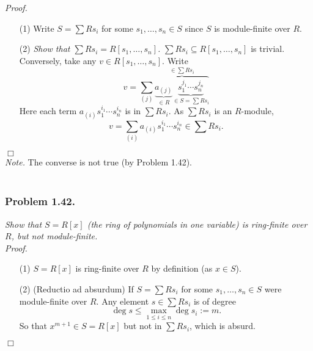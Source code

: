 \documentclass{article}
\begin{document}
\emph{Proof.}
\begin{enumerate}
\item[(1)]
  Write $S = \sum R s_i$ for some $s_1, \ldots, s_n \in S$
  since $S$ is module-finite over $R$.

\item[(2)]
  \emph{Show that $\sum R s_i = R[s_1,\ldots,s_n]$.}
  $\sum R s_i \subseteq R[s_1,\ldots,s_n]$ is trivial.
  Conversely, take any $v \in R[s_1,\ldots,s_n]$.
  Write
  \[
    v = \sum_{(j)} \overbrace{
      \underbrace{a_{(j)}}_{\in R}
      \underbrace{s_1^{j_1} \cdots s_n^{j_n}}_{\in S = \sum R s_i}}^{\in \sum R s_i}
  \]
  Here each term $a_{(i)} s_1^{i_1} \cdots s_n^{i_n}$ is in $\sum R s_i$.
  As $\sum R s_i$ is an $R$-module,
  \[
    v = \sum_{(i)} a_{(i)} s_1^{i_1} \cdots s_n^{i_n} \in \sum R s_i.
  \]
\end{enumerate}
$\Box$ \\



\emph{Note.}
  The converse is not true (by Problem 1.42). \\\\






\subsubsection*{Problem 1.42.}
\emph{Show that $S = R[x]$ (the ring of polynomials in one variable)
is ring-finite over $R$, but not module-finite.} \\

\emph{Proof.}
\begin{enumerate}
\item[(1)]
  $S = R[x]$ is ring-finite over $R$ by definition (as $x \in S$).

\item[(2)]
  (Reductio ad absurdum)
  If $S = \sum R s_i$ for some $s_1, \ldots, s_n \in S$ were module-finite over $R$.
  Any element $s \in \sum R s_i$ is of degree
  \[
    \deg s \leq \max_{1 \leq i \leq n} \deg s_i := m.
  \]
  So that $x^{m+1} \in S = R[x]$ but not in $\sum R s_i$,
  which is absurd.
\end{enumerate}
$\Box$ \\\\
\end{document}
